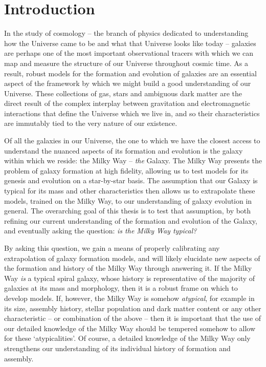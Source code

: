 \chapter{Introduction}
\label{chapter:intro}
In the study of cosmology -- the branch of physics dedicated to understanding how the Universe came to be and what that Universe looks like today -- galaxies are perhaps one of the most important observational tracers with which we can map and measure the structure of our Universe throughout cosmic time. As a result, robust models for the formation and evolution of galaxies are an essential aspect of the framework by which we might build a good understanding of our Universe. These collections of gas, stars and ambiguous dark matter are the direct result of the complex interplay between gravitation and electromagnetic interactions that define the Universe which we live in, and so their characteristics are immutably tied to the very nature of our existence.

Of all the galaxies in our Universe, the one to which we have the closest access to understand the nuanced aspects of its formation and evolution is the galaxy within which we reside: the Milky Way -- \emph{the} Galaxy. The Milky Way presents the problem of galaxy formation at high fidelity, allowing us to test models for its genesis and evolution on a star-by-star basis. The assumption that our Galaxy is typical for its mass and other characteristics then allows us to extrapolate these models, trained on the Milky Way, to our understanding of galaxy evolution in general. The overarching goal of this thesis is to test that assumption, by both refining our current understanding of the formation and evolution of the Galaxy, and eventually asking the question: \emph{is the Milky Way typical?}

By asking this question, we gain a means of properly calibrating any extrapolation of galaxy formation models, and will likely elucidate new aspects of the formation and history of the Milky Way through answering it. If the Milky Way \emph{is} a typical spiral galaxy, whose history is representative of the majority of galaxies at its mass and morphology, then it is a robust frame on which to develop models. If, however, the Milky Way is somehow \emph{atypical}, for example in its size, assembly history, stellar population and dark matter content or any other characteristic --  or combination of the above -- then it is important that the use of our detailed knowledge of the Milky Way should be tempered somehow to allow for these `atypicalities'. Of course, a detailed knowledge of the Milky Way only strengthens our understanding of its individual history of formation and assembly.

